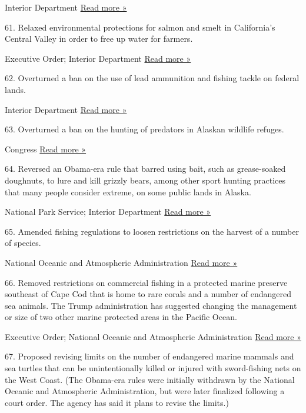  Interior Department \textbar{}
\href{https://www.nytimes3xbfgragh.onion/2019/08/12/climate/endangered-species-act-changes.html}{Read
more »}

61. Relaxed environmental protections for salmon and smelt in
California's Central Valley in order to free up water for farmers.

 Executive Order; Interior Department \textbar{}
\href{https://www.nytimes3xbfgragh.onion/2019/10/22/climate/trump-delta-smelt.html}{Read
more »}

62. Overturned a ban on the use of lead ammunition and fishing tackle on
federal lands.

 Interior Department \textbar{}
\href{https://www.reuters.com/article/us-usa-Interior\%20Department-zinke-idUSKBN16930Z}{Read
more »}

63. Overturned a ban on the hunting of predators in Alaskan wildlife
refuges.

 Congress \textbar{}
\href{http://www.adn.com/alaska-news/wildlife/2017/04/10/congress-and-trump-revoked-the-predator-control-ban-on-alaskas-refuges-now-what/}{Read
more »}

64. Reversed an Obama-era rule that barred using bait, such as
grease-soaked doughnuts, to lure and kill grizzly bears, among other
sport hunting practices that many people consider extreme, on some
public lands in Alaska.

 National Park Service; Interior Department \textbar{}
\href{https://www.nytimes3xbfgragh.onion/2020/06/09/climate/trump-bear-hunting.html}{Read
more »}

65. Amended fishing regulations to loosen restrictions on the harvest of
a number of species.

 National Oceanic and Atmospheric Administration \textbar{}
\href{https://www.usatoday.com/story/news/politics/2018/03/21/go-fish-under-president-trump-changing-political-tide-opens-water-anglers/384747002/}{Read
more »}

66. Removed restrictions on commercial fishing in a protected marine
preserve southeast of Cape Cod that is home to rare corals and a number
of endangered sea animals. The Trump administration has suggested
changing the management or size of two other marine protected areas in
the Pacific Ocean.

 Executive Order; National Oceanic and Atmospheric Administration
\textbar{}
\href{https://www.wbur.org/earthwhile/2020/06/05/trump-roll-back-marine-monument-protections}{Read
more »}

67. Proposed revising limits on the number of endangered marine mammals
and sea turtles that can be unintentionally killed or injured with
sword-fishing nets on the West Coast. (The Obama-era rules were
initially withdrawn by the National Oceanic and Atmospheric
Administration, but were later finalized following a court order. The
agency has said it plans to revise the limits.)

